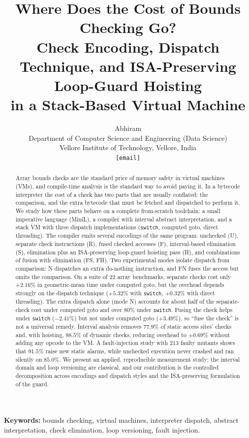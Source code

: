 \documentclass[11pt,a4paper]{article}
\title{Where Does the Cost of Bounds Checking Go?\\
Check Encoding, Dispatch Technique, and ISA-Preserving Loop-Guard Hoisting\\
in a Stack-Based Virtual Machine}
\author{Abhiram \\
Department of Computer Science and Engineering (Data Science)\\
Vellore Institute of Technology, Vellore, India\\
\texttt{[email]}}
\date{}
\begin{document}
\maketitle

\begin{abstract}
Array bounds checks are the standard price of memory safety in virtual machines (VMs), and compile-time analysis is the standard way to avoid paying it. In a bytecode interpreter the cost of a check has two parts that are usually conflated: the comparison, and the extra bytecode that must be fetched and dispatched to perform it. We study how these parts behave on a complete from-scratch toolchain: a small imperative language (MiniL), a compiler with interval abstract interpretation, and a stack VM with three dispatch implementations (\texttt{switch}, computed goto, direct threading). The compiler emits several encodings of the same program: unchecked (U), separate check instructions (R), fused checked accesses (F), interval-based elimination (S), elimination plus an ISA-preserving loop-guard hoisting pass (H), and combinations of fusion with elimination (FS, FH). Two experimental modes isolate dispatch from comparison: N dispatches an extra do-nothing instruction, and FN fuses the access but omits the comparison. On a suite of 22 array benchmarks, separate checks cost only $+2.16\%$ in geometric-mean time under computed goto, but the overhead depends strongly on the dispatch technique ($+5.32\%$ with \texttt{switch}, $+0.32\%$ with direct threading). The extra dispatch alone (mode N) accounts for about half of the separate-check cost under computed goto and over $80\%$ under \texttt{switch}. Fusing the check helps under \texttt{switch} ($-2.41\%$) but not under computed goto ($+3.49\%$), so ``fuse the check'' is not a universal remedy. Interval analysis removes $77.9\%$ of static access sites' checks and, with hoisting, $88.5\%$ of dynamic checks, reducing overhead to $+0.69\%$ without adding any opcode to the VM. A fault-injection study with 213 faulty mutants shows that $91.5\%$ raise new static alarms, while unchecked execution never crashed and ran silently on $85.0\%$. We present an applied, reproducible measurement study; the interval domain and loop versioning are classical, and our contribution is the controlled decomposition across encodings and dispatch styles and the ISA-preserving formulation of the guard.
\end{abstract}

\noindent\textbf{Keywords:} bounds checking, virtual machines, interpreter dispatch, abstract interpretation, check elimination, loop versioning, fault injection.
\end{document}
